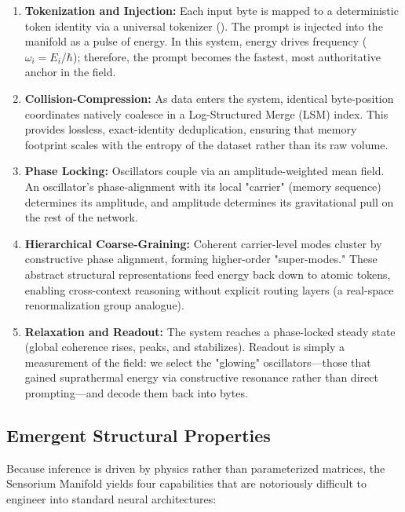\documentclass[11pt,a4paper]{article}
\begin{document}
\begin{enumerate}[nosep]
  \item \textbf{Tokenization and Injection:} Each input byte is mapped to a deterministic token identity via a universal tokenizer (). The prompt is injected into the manifold as a pulse of energy. In this system, energy drives frequency ($\omega_i = E_i/\hbar$); therefore, the prompt becomes the fastest, most authoritative anchor in the field.
  \item \textbf{Collision-Compression:} As data enters the system, identical byte-position coordinates natively coalesce in a Log-Structured Merge (LSM) index. This provides lossless, exact-identity deduplication, ensuring that memory footprint scales with the entropy of the dataset rather than its raw volume.
  \item \textbf{Phase Locking:} Oscillators couple via an amplitude-weighted mean field. An oscillator's phase-alignment with its local "carrier" (memory sequence) determines its amplitude, and amplitude determines its gravitational pull on the rest of the network. 
  \item \textbf{Hierarchical Coarse-Graining:} Coherent carrier-level modes cluster by constructive phase alignment, forming higher-order "super-modes." These abstract structural representations feed energy back down to atomic tokens, enabling cross-context reasoning without explicit routing layers (a real-space renormalization group analogue).
  \item \textbf{Relaxation and Readout:} The system reaches a phase-locked steady state (global coherence rises, peaks, and stabilizes). Readout is simply a measurement of the field: we select the "glowing" oscillators—those that gained suprathermal energy via constructive resonance rather than direct prompting—and decode them back into bytes.
\end{enumerate}

\subsection{Emergent Structural Properties}
Because inference is driven by physics rather than parameterized matrices, the Sensorium Manifold yields four capabilities that are notoriously difficult to engineer into standard neural architectures:
\end{document}
